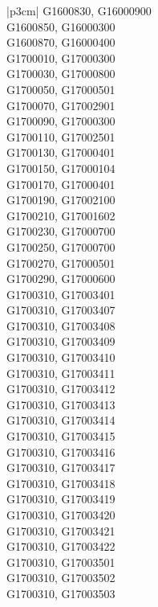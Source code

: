 \begin{customLongTable}{ |p{3cm}| }
G1600830, G16000900 \\ \hline
G1600850, G16000300 \\ \hline
G1600870, G16000400 \\ \hline
G1700010, G17000300 \\ \hline
G1700030, G17000800 \\ \hline
G1700050, G17000501 \\ \hline
G1700070, G17002901 \\ \hline
G1700090, G17000300 \\ \hline
G1700110, G17002501 \\ \hline
G1700130, G17000401 \\ \hline
G1700150, G17000104 \\ \hline
G1700170, G17000401 \\ \hline
G1700190, G17002100 \\ \hline
G1700210, G17001602 \\ \hline
G1700230, G17000700 \\ \hline
G1700250, G17000700 \\ \hline
G1700270, G17000501 \\ \hline
G1700290, G17000600 \\ \hline
G1700310, G17003401 \\ \hline
G1700310, G17003407 \\ \hline
G1700310, G17003408 \\ \hline
G1700310, G17003409 \\ \hline
G1700310, G17003410 \\ \hline
G1700310, G17003411 \\ \hline
G1700310, G17003412 \\ \hline
G1700310, G17003413 \\ \hline
G1700310, G17003414 \\ \hline
G1700310, G17003415 \\ \hline
G1700310, G17003416 \\ \hline
G1700310, G17003417 \\ \hline
G1700310, G17003418 \\ \hline
G1700310, G17003419 \\ \hline
G1700310, G17003420 \\ \hline
G1700310, G17003421 \\ \hline
G1700310, G17003422 \\ \hline
G1700310, G17003501 \\ \hline
G1700310, G17003502 \\ \hline
G1700310, G17003503 \\ \hline

\end{customLongTable}

